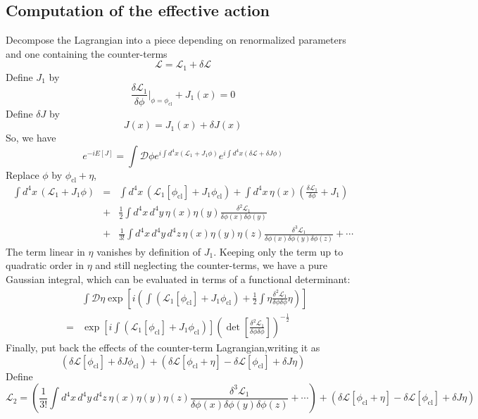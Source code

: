 \subsection{Computation of the effective action}
\noindent
Decompose the Lagrangian into a piece depending on renormalized parameters and one containing the counter-terms
\[\mathcal{L} = \mathcal{L}_1 + \delta \mathcal{L}\]
Define $J_1$ by
\[\frac{\delta \mathcal{L}_1}{\delta \phi} |_{\phi = \phi_{\mathrm{cl}}} + J_1(x) = 0\]
Define $\delta J$ by
\[J(x) = J_1(x) + \delta J(x)\]
So, we have
\[e^{-iE[J]} = \int \mathcal{D}\phi e^{i\int d^4x (\mathcal{L}_1 + J_1\phi)} e^{i\int d^4x (\delta \mathcal{L} + \delta J \phi)}\]
Replace $\phi$ by $\phi_{\mathrm{cl}}+\eta$,
\begin{eqnarray}
\int d^4x \, (\mathcal{L}_1 + J_1\phi) &=& \int d^4x \, (\mathcal{L}_1[\phi_{\mathrm{cl}}] + J_1\phi_{\mathrm{cl}}) + \int d^4x \, \eta(x) \left( \frac{\delta \mathcal{L}_1}{\delta \phi} + J_1 \right) \nonumber \\
&+& \frac{1}{2} \int d^4x \, d^4y \, \eta(x) \eta(y) \frac{\delta^2 \mathcal{L}_1}{\delta \phi(x) \delta \phi(y)} \nonumber \\
&+& \frac{1}{3!} \int d^4x \, d^4y \, d^4z \, \eta(x) \eta(y) \eta(z) \frac{\delta^3 \mathcal{L}_1}{\delta \phi(x) \delta \phi(y) \delta \phi(z)} + \cdots \nonumber
\end{eqnarray}
The term linear in $\eta$ vanishes by definition of $J_1$.  Keeping only the term up to quadratic order in $\eta$ and still neglecting the counter-terms, we have a pure Gaussian integral, which can be evaluated in terms of a functional determinant:
\begin{eqnarray}
&&\int \mathcal{D}\eta \exp \left[ i \left( \int ( \mathcal{L}_1 [\phi_{\mathrm{cl}}] + J_1\phi_{\mathrm{cl}} ) +  \frac{1}{2} \int \eta \frac{\delta^2 \mathcal{L}_1}{\delta \phi \delta \phi} \eta \right) \right] \nonumber \\
&=& \exp \left[ i \int ( \mathcal{L}_1 [\phi_{\mathrm{cl}}] + J_1\phi_{\mathrm{cl}} )\right] \left( \det \left[  \frac{\delta^2 \mathcal{L}_1}{\delta \phi \delta \phi} \right] \right) ^{-\frac{1}{2}} \nonumber
\end{eqnarray}
Finally, put back the effects of the counter-term Lagrangian,writing it as
\[(\delta \mathcal{L}[\phi_{\mathrm{cl}}] + \delta J \phi_{\mathrm{cl}} ) + ( \delta \mathcal{L}[\phi_{\mathrm{cl}} + \eta] - \delta\mathcal{L} [\phi_{\mathrm{cl}}] + \delta J \eta)\]
Define
\[\mathcal{L}_2 = \left(\frac{1}{3!} \int d^4x \, d^4y \, d^4z \, \eta(x) \eta(y) \eta(z) \frac{\delta^3 \mathcal{L}_1}{\delta \phi(x) \delta \phi(y) \delta \phi(z)} + \cdots \right) + ( \delta \mathcal{L}[\phi_{\mathrm{cl}} + \eta] - \delta\mathcal{L} [\phi_{\mathrm{cl}}] + \delta J \eta)\]

